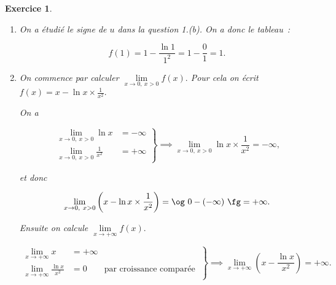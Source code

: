 \documentclass[10pt]{article}
\newtheorem{exo}{Exercice}
\begin{document}
\begin{exo}
\begin{enumerate}
\begin{enumerate}
\item On a étudié le signe de $u$ dans la question 1.(b). On a donc le tableau~:

\medskip
\begin{center}
\end{center}

\medskip

\[f(1)=1-\frac{\ln 1}{1^2}=1-\frac{0}{1}=1.\]

\item On commence par calculer $\lim\limits_{x\to 0,~x>0}f(x).$ Pour cela on écrit $f(x)=x-\ln x\times \frac{1}{x^2}.$

\medskip

On a

\[\left.
    \begin{array}{ll}
        \lim\limits_{x\to 0,~x>0}\ln x&= -\infty\\
        \lim\limits_{x\to 0,~x>0}\frac{1}{x^2}&= +\infty
    \end{array}
\right \}\implies \lim\limits_{x\to 0,~x>0}\ln x\times \frac{1}{x^2}= -\infty,\]

et donc

\[\lim\limits_{x\to 0,~x>0}\left(x-\ln x\times \frac{1}{x^2}\right)=\og~ 0-(-\infty)~\fg=+\infty.\]

\medskip

Ensuite on calcule $\lim\limits_{x\to +\infty}f(x).$

\medskip

\[\left.
    \begin{array}{ll}
        \lim\limits_{x\to +\infty}x&= +\infty\\
        \lim\limits_{x\to +\infty}\frac{\ln x}{x^2}&= 0\qquad \text{par croissance comparée}~
    \end{array}
\right \}\implies \lim\limits_{x\to +\infty}\left(x-\frac{\ln x}{x^2}\right)= +\infty.\]


\end{enumerate}
\end{enumerate}

\end{exo}
\end{document}
